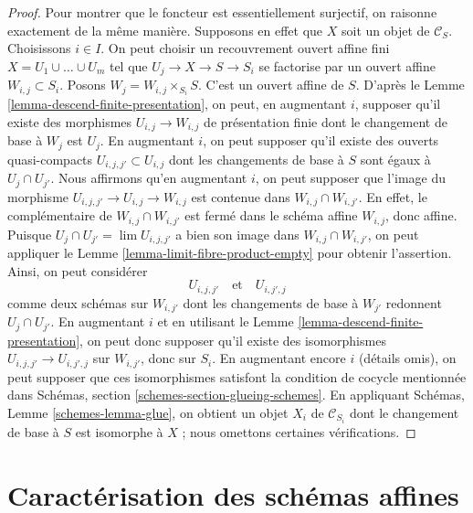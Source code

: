 \begin{proof}
\medskip\noindent
Pour montrer que le foncteur est essentiellement surjectif, on raisonne
exactement de la même manière. Supposons en effet que
$X$ soit un objet de $\mathcal{C}_S$. Choisissons $i \in I$.
On peut choisir un recouvrement ouvert affine fini
$X = U_1 \cup \ldots \cup U_m$ tel que $U_j \to X \to S \to S_i$
se factorise par un ouvert affine $W_{i, j} \subset S_i$.
Posons $W_j = W_{i, j} \times_{S_i} S$. C'est un ouvert affine de $S$.
D'après le Lemme \ref{lemma-descend-finite-presentation},
on peut, en augmentant $i$, supposer qu'il existe des morphismes
$U_{i, j} \to W_{i, j}$ de présentation finie
dont le changement de base à $W_j$ est $U_j$.
En augmentant $i$, on peut supposer qu'il existe
des ouverts quasi-compacts $U_{i, j, j'} \subset U_{i, j}$
dont les changements de base à $S$ sont égaux à $U_j \cap U_{j'}$.
Nous affirmons qu'en augmentant $i$, on peut supposer que l'image du morphisme
$U_{i, j, j'} \to U_{i, j} \to W_{i, j}$
est contenue dans $W_{i, j} \cap W_{i, j'}$.
En effet, le complémentaire de $W_{i, j} \cap W_{i, j'}$
est fermé dans le schéma affine $W_{i, j}$, donc affine.
Puisque $U_j \cap U_{j'} = \lim U_{i, j, j'}$ a bien son image dans
$W_{i, j} \cap W_{i, j'}$,
on peut appliquer le Lemme \ref{lemma-limit-fibre-product-empty}
pour obtenir l'assertion. Ainsi, on peut considérer
$$
U_{i, j, j'} \quad\text{et}\quad U_{i, j', j}
$$
comme deux schémas sur $W_{i, j'}$ dont les changements de base à $W_{j'}$
redonnent $U_j \cap U_{j'}$. En augmentant $i$ et en utilisant le
Lemme \ref{lemma-descend-finite-presentation},
on peut donc supposer qu'il existe des isomorphismes
$U_{i, j, j'} \to U_{i, j', j}$ sur $W_{i, j'}$, donc
sur $S_i$. En augmentant encore $i$ (détails omis),
on peut supposer que ces isomorphismes
satisfont la condition de cocycle mentionnée dans
Schémas, section \ref{schemes-section-glueing-schemes}.
En appliquant Schémas, Lemme \ref{schemes-lemma-glue},
on obtient un objet $X_i$ de $\mathcal{C}_{S_i}$ dont le
changement de base à $S$ est isomorphe à $X$ ; nous omettons
certaines vérifications.
\end{proof}












\section{Caractérisation des schémas affines}
\label{section-affine}

